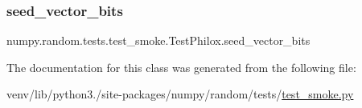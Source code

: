 \subsubsection{\texorpdfstring{seed\+\_\+vector\+\_\+bits}{seed\_vector\_bits}}
{\footnotesize\ttfamily numpy.\+random.\+tests.\+test\+\_\+smoke.\+Test\+Philox.\+seed\+\_\+vector\+\_\+bits}



The documentation for this class was generated from the following file\+:\begin{DoxyCompactItemize}
\item 
venv/lib/python3./site-\/packages/numpy/random/tests/\hyperlink{test__smoke_8py}{test\+\_\+smoke.\+py}\end{DoxyCompactItemize}
